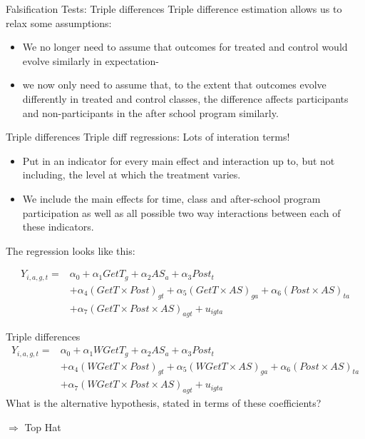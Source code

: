 \documentclass[
  ignorenonframetext,
]{beamer}
\begin{document}
\begin{frame}{Falsification Tests: Triple differences}
\protect\hypertarget{falsification-tests-triple-differences-2}{}
Triple difference estimation allows us to relax some assumptions:

\begin{itemize}
\item
  We no longer need to assume that outcomes for treated and control
  would evolve similarly in expectation-
\item
  we now only need to assume that, to the extent that outcomes evolve
  differently in treated and control classes, the difference affects
  participants and non-participants in the after school program
  similarly.
\end{itemize}
\end{frame}

\begin{frame}{Triple differences}
\protect\hypertarget{triple-differences}{}
Triple diff regressions: Lots of interation terms!

\begin{itemize}
\item
  Put in an indicator for every main effect and interaction up to, but
  not including, the level at which the treatment varies.
\item
  We include the main effects for time, class and after-school program
  participation as well as all possible two way interactions between
  each of these indicators.
\end{itemize}

The regression looks like this:

\[
\begin{aligned}
Y_{i,a,g,t}=&\alpha_0+\alpha_1 GetT_{g}+\alpha_2 AS_{a}+\alpha_3 Post_{t}\\
&+\alpha_4 (GetT \times Post)_{gt}+\alpha_5 (GetT \times AS)_{ga}+\alpha_6 (Post \times AS)_{ta}\\
&+\alpha_7 (GetT \times Post \times AS)_{agt}+u_{igta}
\end{aligned}
\]
\end{frame}

\begin{frame}{Triple differences}
\protect\hypertarget{triple-differences-1}{}
\[
\begin{aligned}
Y_{i,a,g,t}=&\alpha_0+\alpha_1 WGetT_{g}+\alpha_2 AS_{a}+\alpha_3 Post_{t}\\
&+\alpha_4 (WGetT \times Post)_{gt}+\alpha_5 (WGetT \times AS)_{ga}+\alpha_6 (Post \times AS)_{ta}\\
&+\alpha_7 (WGetT \times Post \times AS)_{agt}+u_{igta}
\end{aligned}
\] What is the alternative hypothesis, stated in terms of these
coefficients?

\(\Rightarrow\) Top Hat
\end{frame}
\end{document}
